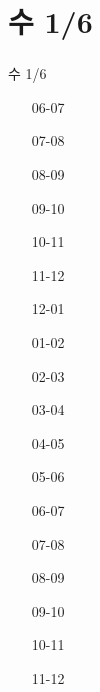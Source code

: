 \documentclass[aspectratio=1610,20pt,xcolor=pdftex,dvipsnames,table,handout]{beamer}
\begin{document}
	\section{수 1/6}											
	\begin{frame} [t,plain]											
	\frametitle{}											
		\begin{block} {수 1/6}
		\setlength{\leftmargini}{3em}										
		\begin{itemize}										
			\item [06-07] \hrulefill									
			\item [07-08] \hrulefill									
			\item [08-09] \hrulefill									
			\item [09-10] \hrulefill									
			\item [10-11] \hrulefill									
			\item [11-12] \hrulefill									
			\item [12-01] \hrulefill									
			\item [01-02] \hrulefill									
			\item [02-03] \hrulefill									
			\item [03-04] \hrulefill									
			\item [04-05] \hrulefill									
			\item [05-06] \hrulefill									
			\item [06-07] \hrulefill									
			\item [07-08] \hrulefill									
			\item [08-09] \hrulefill									
			\item [09-10] \hrulefill									
			\item [10-11] \hrulefill									
			\item [11-12] \hrulefill									
		\end{itemize}										
		\end{block}										
	\end{frame}											
												
\end{document}
